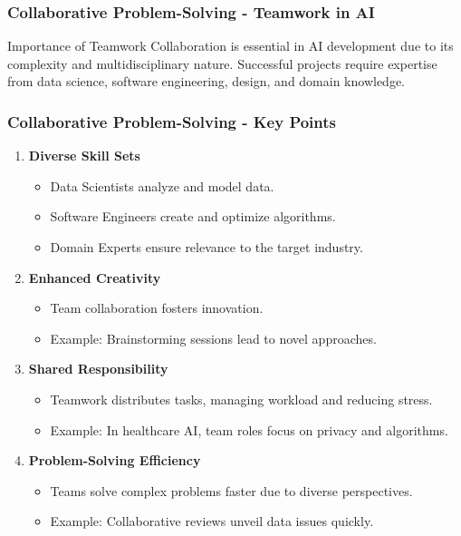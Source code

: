 \documentclass{beamer}
\begin{document}
\begin{frame}[fragile]
    \frametitle{Collaborative Problem-Solving - Teamwork in AI}
    \begin{block}{Importance of Teamwork}
        Collaboration is essential in AI development due to its complexity and multidisciplinary nature.
        Successful projects require expertise from data science, software engineering, design, and domain knowledge.
    \end{block}
\end{frame}

\begin{frame}[fragile]
    \frametitle{Collaborative Problem-Solving - Key Points}
    \begin{enumerate}
        \item \textbf{Diverse Skill Sets}
        \begin{itemize}
            \item Data Scientists analyze and model data.
            \item Software Engineers create and optimize algorithms.
            \item Domain Experts ensure relevance to the target industry.
        \end{itemize}
        
        \item \textbf{Enhanced Creativity}
        \begin{itemize}
            \item Team collaboration fosters innovation.
            \item Example: Brainstorming sessions lead to novel approaches.
        \end{itemize}
        
        \item \textbf{Shared Responsibility}
        \begin{itemize}
            \item Teamwork distributes tasks, managing workload and reducing stress.
            \item Example: In healthcare AI, team roles focus on privacy and algorithms.
        \end{itemize}
        
        \item \textbf{Problem-Solving Efficiency}
        \begin{itemize}
            \item Teams solve complex problems faster due to diverse perspectives.
            \item Example: Collaborative reviews unveil data issues quickly.
        \end{itemize}
    \end{enumerate}
\end{frame}
\end{document}
